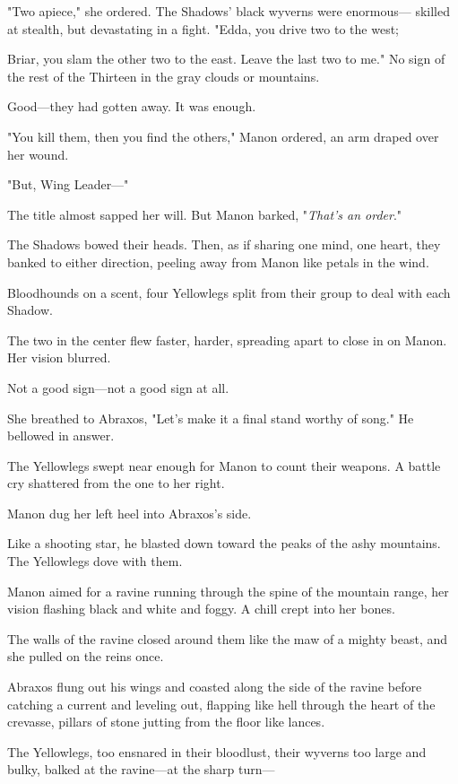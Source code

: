 "Two apiece," she ordered.
The Shadows' black wyverns were enormous--- skilled at stealth, but devastating in a fight.
"Edda, you drive two to the west;

Briar, you slam the other two to the east.
Leave the last two to me."
No sign of the rest of the Thirteen in the gray clouds or mountains.

Good---they had gotten away.
It was enough.

"You kill them, then you find the others," Manon ordered, an arm draped over her wound.

"But, Wing Leader---"

The title almost sapped her will.
But Manon barked, "\emph{That's an order}."

The Shadows bowed their heads.
Then, as if sharing one mind, one heart, they banked to either direction, peeling away from Manon like petals in the wind.

Bloodhounds on a scent, four Yellowlegs split from their group to deal with each Shadow.

The two in the center flew faster, harder, spreading apart to close in on Manon.
Her vision blurred.

Not a good sign---not a good sign at all.

She breathed to Abraxos, "Let's make it a final stand worthy of song."
He bellowed in answer.

The Yellowlegs swept near enough for Manon to count their weapons.
A battle cry shattered from the one to her right.

Manon dug her left heel into Abraxos's side.

Like a shooting star, he blasted down toward the peaks of the ashy mountains.
The Yellowlegs dove with them.

Manon aimed for a ravine running through the spine of the mountain range, her vision flashing black and white and foggy.
A chill crept into her bones.

The walls of the ravine closed around them like the maw of a mighty beast, and she pulled on the reins once.

Abraxos flung out his wings and coasted along the side of the ravine before catching a current and leveling out, flapping like hell through the heart of the crevasse, pillars of stone jutting from the floor like lances.

The Yellowlegs, too ensnared in their bloodlust, their wyverns too large and bulky, balked at the ravine---at the sharp turn---

